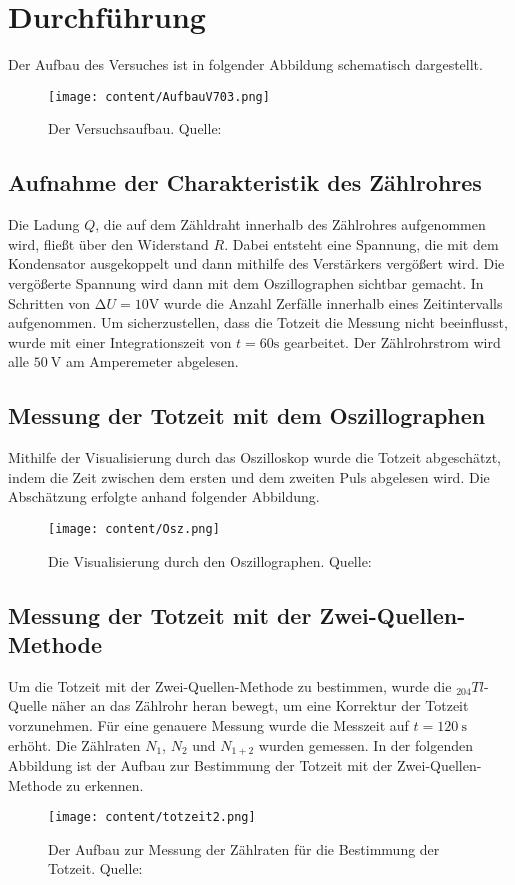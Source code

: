 \section{Durchführung}
\label{sec:Durchführung}
Der Aufbau des Versuches ist in folgender Abbildung schematisch dargestellt.
  \begin{figure}[H]
    \centering
      \texttt{[image: content/AufbauV703.png]}
      \caption{Der Versuchsaufbau. Quelle:\cite{AP01}}
      \label{fig:aufbau3}
  \end{figure}
\noindent
\subsection{Aufnahme der Charakteristik des Zählrohres}
    Die Ladung $Q$, die auf dem Zähldraht innerhalb des Zählrohres aufgenommen wird, fließt über den
    Widerstand $R$. Dabei entsteht eine Spannung, die mit dem Kondensator ausgekoppelt und dann
    mithilfe des Verstärkers vergößert wird. Die vergößerte Spannung wird dann mit dem Oszillographen
    sichtbar gemacht. In Schritten von $\increment U = 10 \si{\volt}$ wurde die Anzahl Zerfälle
    innerhalb eines Zeitintervalls aufgenommen. Um sicherzustellen, dass die Totzeit die Messung nicht
    beeinflusst, wurde mit einer Integrationszeit von $t = 60 \si{\second}$ gearbeitet. Der
    Zählrohrstrom wird alle $\SI{50}{\volt}$ am Amperemeter abgelesen.
\subsection{Messung der Totzeit mit dem Oszillographen}
  Mithilfe der Visualisierung durch das Oszilloskop wurde die Totzeit abgeschätzt, indem die Zeit
  zwischen dem ersten und dem zweiten Puls abgelesen wird. Die Abschätzung erfolgte anhand folgender
  Abbildung.
  \begin{figure}[H]
    \centering
      \texttt{[image: content/Osz.png]}
      \caption{Die Visualisierung durch den Oszillographen. Quelle:\cite{AP02}}
      \label{fig:totzeit1}
  \end{figure}
\subsection{Messung der Totzeit mit der Zwei-Quellen-Methode}
  Um die Totzeit mit der Zwei-Quellen-Methode zu bestimmen, wurde die $_{204}Tl$-Quelle näher an das
  Zählrohr heran bewegt, um eine Korrektur der Totzeit vorzunehmen. Für eine genauere Messung wurde
  die Messzeit auf $t = \SI{120}{\second}$ erhöht. Die Zählraten $N_{1}$, $N_{2}$ und $N_{1+2}$ wurden
  gemessen. In der folgenden Abbildung ist der Aufbau zur Bestimmung der Totzeit mit der Zwei-Quellen-
  Methode zu erkennen.
  \begin{figure}[H]
    \centering
      \texttt{[image: content/totzeit2.png]}
      \caption{Der Aufbau zur Messung der Zählraten für die Bestimmung der Totzeit. Quelle:\cite{AP02}}
      \label{fig:totzeit2}
  \end{figure}
